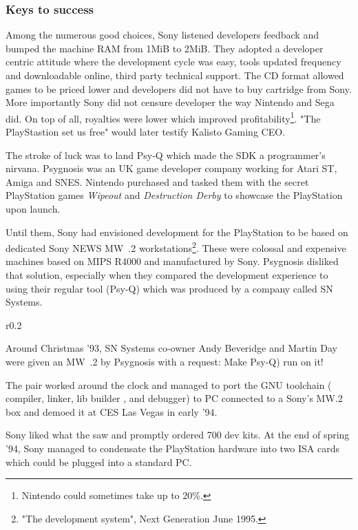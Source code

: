 \subsubsection{Keys to success}
\par
 Among the numerous good choices, Sony listened developers feedback and bumped the machine RAM from 1MiB to 2MiB.  They adopted a developer centric attitude where the development cycle was easy, tools updated frequency and downloadable online, third party technical support. The CD format allowed games to be priced lower and developers did not have to buy cartridge from Sony. More importantly Sony did not censure developer the way Nintendo and Sega did. On top of all, royalties were lower which improved profitability\footnote{Nintendo could sometimes take up to 20\%.}. "The PlayStastion set us free" would later testify Kalisto Gaming CEO.\\
\par
The stroke of luck was to land Psy-Q which made the SDK a programmer's nirvana. Psygnosis was an UK game developer company working for Atari ST, Amiga and SNES. Nintendo purchased and tasked them with the secret PlayStation games \textit{Wipeout} and \textit{Destruction Derby} to showcase the PlayStation upon launch.\\
\par
Until them, Sony had envisioned development for the PlayStation to be based on dedicated Sony NEWS MW~.2 workstations\footnote{"The development system", Next Generation June 1995.}. These were colossal and expensive machines based on MIPS R4000 and manufactured by Sony. Psygnosis disliked that solution, especially when they compared the development experience to using their regular tool (Psy-Q) which was produced by a company called SN Systems.\\
\par
\begin{wrapfigure}[10]{r}{0.2\textwidth}{
\centering {}}
\end{wrapfigure}
Around Christmas '93, SN Systems co-owner Andy Beveridge and Martin Day were given an MW~.2 by Psygnosis with a request: Make Psy-Q) run on it!\\
\par
 The pair worked around the clock and managed to port the GNU toolchain ( compiler,  linker, lib builder , and  debugger) to PC connected to a Sony's MW.2 box and demoed it at CES Las Vegas in early '94.\\
\par
 Sony liked what the saw and promptly ordered 700 dev kits. At the end of spring '94, Sony managed to condensate the PlayStation hardware into two ISA cards which could be plugged into a standard PC.\\

